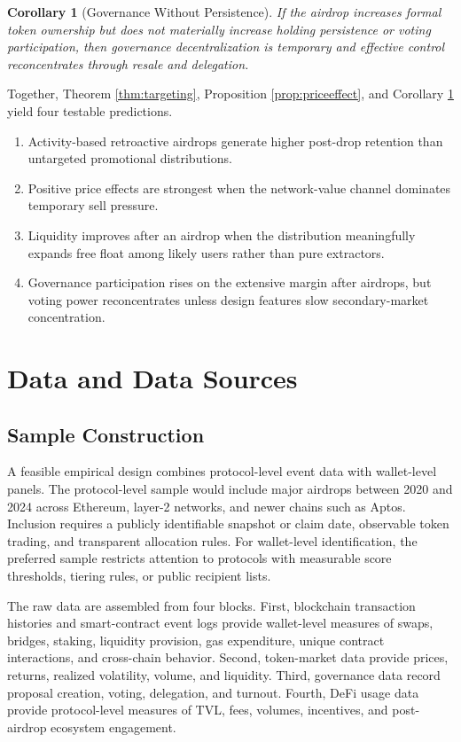 \documentclass[11pt]{article}
\newtheorem{corollary}{Corollary}
\theoremstyle{remark}
\begin{document}
\begin{corollary}[Governance Without Persistence]
\label{cor:governance}
If the airdrop increases formal token ownership but does not materially increase holding persistence or voting participation, then governance decentralization is temporary and effective control reconcentrates through resale and delegation.
\end{corollary}

Together, Theorem \ref{thm:targeting}, Proposition \ref{prop:priceeffect}, and Corollary \ref{cor:governance} yield four testable predictions.

\begin{enumerate}[leftmargin=1.5em]
\item Activity-based retroactive airdrops generate higher post-drop retention than untargeted promotional distributions.
\item Positive price effects are strongest when the network-value channel dominates temporary sell pressure.
\item Liquidity improves after an airdrop when the distribution meaningfully expands free float among likely users rather than pure extractors.
\item Governance participation rises on the extensive margin after airdrops, but voting power reconcentrates unless design features slow secondary-market concentration.
\end{enumerate}

\section{Data and Data Sources}

\subsection{Sample Construction}

A feasible empirical design combines protocol-level event data with wallet-level panels. The protocol-level sample would include major airdrops between 2020 and 2024 across Ethereum, layer-2 networks, and newer chains such as Aptos. Inclusion requires a publicly identifiable snapshot or claim date, observable token trading, and transparent allocation rules. For wallet-level identification, the preferred sample restricts attention to protocols with measurable score thresholds, tiering rules, or public recipient lists.

The raw data are assembled from four blocks. First, blockchain transaction histories and smart-contract event logs provide wallet-level measures of swaps, bridges, staking, liquidity provision, gas expenditure, unique contract interactions, and cross-chain behavior. Second, token-market data provide prices, returns, realized volatility, volume, and liquidity. Third, governance data record proposal creation, voting, delegation, and turnout. Fourth, DeFi usage data provide protocol-level measures of TVL, fees, volumes, incentives, and post-airdrop ecosystem engagement.
\end{document}
